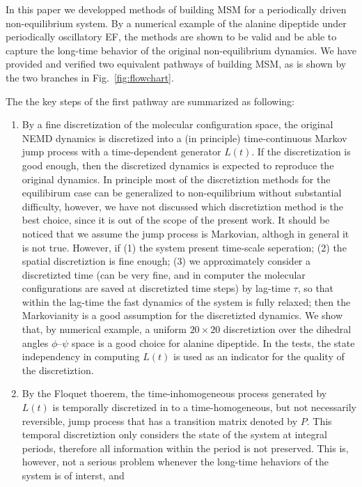 \documentclass[aps, pre, preprint,unsortedaddress,a4paper,onecolumn]{revtex4}
\newcommand{\recheck}[1]{{\color{red} #1}}
\begin{document}
In this paper we developped methods of building MSM for a periodically driven
non-equilibrium system. By a numerical example
of the alanine dipeptide under periodically oscillatory EF,
the methods are shown  to be
valid and be able to capture the long-time behavior of the original
non-equilibrium dynamics. We have provided and verified two equivalent
pathways of building MSM, as is shown by the two branches in
Fig.~\ref{fig:flowchart}.

The the key steps of the first pathway are
summarized as following:
\begin{enumerate}
\item By a fine discretization of the molecular configuration space,
  the original NEMD dynamics is discretized into a (in principle)
  time-continuous \recheck{Markov} jump process with a time-dependent generator $L(t)$.
  If the discretization is good enough, then the discretized
  dynamics is expected to reproduce the original dynamics.
  In principle most of the discretiztion methods for the
  equilibirum case can be generalized to  non-equilibrium without
  substantial difficulty, however,
  we have not discussed which discretiztion method is the best choice,
  since it is out of the scope of the present work.
  \recheck{It should be noticed that
    we assume the jump process is Markovian, althogh in
    general it is not true. However, if (1) the system present time-scale
    seperation; (2) the spatial discretiztion is fine enough; (3)
    we approximately consider a discretizted time
    (can be very fine, and in computer the molecular configurations are
    saved at discretizted time steps)
    by lag-time $\tau$, so that within the lag-time
    the fast dynamics of the system is fully relaxed; then
    the Markovianity is a good assumption for the discretizted dynamics.
  }
  We show that, by numerical example, a uniform $20\times20$ discretiztion 
  over the dihedral angles $\phi$--$\psi$ space is a good choice for
  alanine dipeptide.
  In the tests, the state independency in computing $L(t)$
  is used as an indicator for
  the quality of the discretiztion.
\item By the Floquet thoerem, the time-inhomogeneous process generated
  by $L(t)$ is temporally discretized in to a time-homogeneous,
  but not necessarily reversible, jump process that has a transition
  matrix denoted by $P$. This temporal discretiztion only  considers
  the state of the system at integral periods, therefore all information
  within the period is not preserved. This is, however, not a serious
  problem whenever the long-time hehaviors of the system is of interst, and

\end{enumerate}
\end{document}
